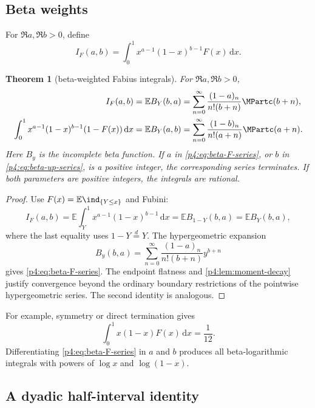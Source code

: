 \documentclass[11pt,oneside]{article}
\newtheorem{theorem}{Theorem}[section]
\theoremstyle{definition}
\theoremstyle{remark}
\newcommand{\F}{F}
\newcommand{\E}{\mathbb E}
\newcommand{\dd}{\,\mathrm d}
\newcommand{\1}{\mathbf 1}
\begin{document}
\subsection{Beta weights}

For \(\Re a,\Re b>0\), define
\begin{equation}\label{p4:eq:IFab}
 I_F(a,b)=\int_0^1x^{a-1}(1-x)^{b-1}\F(x)\dd x.
\end{equation}

\begin{theorem}[beta-weighted Fabius integrals]\label{p4:thm:beta-F}
For \(\Re a,\Re b>0\),
\begin{align}
 I_F(a,b)
 &=\E B_Y(b,a)
 =\sum_{n=0}^{\infty}
 \frac{(1-a)_n}{n!(b+n)}\MPartc(b+n),
 \label{p4:eq:beta-F-series}\\
 \int_0^1x^{a-1}(1-x)^{b-1}(1-\F(x))\dd x
 &=\E B_Y(a,b)
 =\sum_{n=0}^{\infty}
 \frac{(1-b)_n}{n!(a+n)}\MPartc(a+n).
 \label{p4:eq:beta-up-series}
\end{align}
Here \(B_y\) is the incomplete beta function.  If \(a\) in
\cref{p4:eq:beta-F-series}, or \(b\) in \cref{p4:eq:beta-up-series}, is a positive integer,
the corresponding series terminates.  If both parameters are positive integers, the
integrals are rational.
\end{theorem}

\begin{proof}
Use \(\F(x)=\E\ind_{\{Y\le x\}}\) and Fubini:
\[
 I_F(a,b)=\E\int_Y^1x^{a-1}(1-x)^{b-1}\dd x
 =\E B_{1-Y}(b,a)=\E B_Y(b,a),
\]
where the last equality uses \(1-Y\overset d=Y\).  The hypergeometric expansion
\[
 B_y(b,a)=\sum_{n=0}^{\infty}
 \frac{(1-a)_n}{n!(b+n)}y^{b+n}
\]
gives \cref{p4:eq:beta-F-series}.  The endpoint flatness and
\cref{p4:lem:moment-decay} justify convergence beyond the ordinary boundary restrictions
of the pointwise hypergeometric series.  The second identity is analogous.
\end{proof}

For example, symmetry or direct termination gives
\begin{equation}\label{p4:eq:beta-example}
 \int_0^1x(1-x)\F(x)\dd x=\frac1{12}.
\end{equation}
Differentiating \cref{p4:eq:beta-F-series} in \(a\) and \(b\) produces all beta-logarithmic
integrals with powers of \(\log x\) and \(\log(1-x)\).

\subsection{A dyadic half-interval identity}
\end{document}
